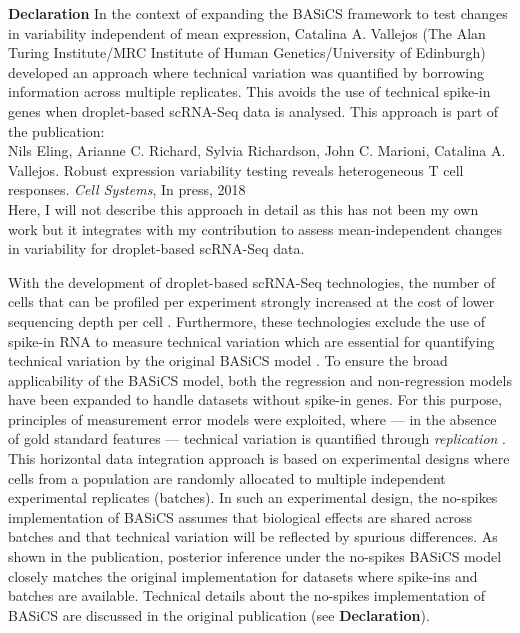 \begin{Comment}
\textbf{Declaration} In the context of expanding the BASiCS framework to test changes in variability independent of mean expression, Catalina A. Vallejos (The Alan Turing Institute/MRC Institute of Human Genetics/University of Edinburgh) developed an approach where technical variation was quantified by borrowing information across multiple replicates. This avoids the use of technical spike-in genes when droplet-based scRNA-Seq data is analysed. This approach is part of the publication:\\

Nils Eling, Arianne C. Richard, Sylvia Richardson, John C. Marioni, Catalina A. Vallejos. Robust expression variability testing reveals heterogeneous T cell responses. \emph{Cell Systems}, In press, 2018 \\

Here, I will not describe this approach in detail as this has not been my own work but it integrates with my contribution to assess mean-independent changes in variability for droplet-based scRNA-Seq data.
\end{Comment}

With the development of droplet-based scRNA-Seq technologies, the number of cells that can be profiled per experiment strongly increased at the cost of lower sequencing depth per cell \citep{Macosko2015, Klein2015, Zheng2017}. Furthermore, these technologies exclude the use of spike-in RNA to measure technical variation which are essential for quantifying technical variation by the original BASiCS model \citep{Vallejos2015BASiCS, Vallejos2016}. To ensure the broad applicability of the BASiCS model, both the regression and non-regression models have been expanded to handle datasets without spike-in genes. For this purpose, principles of measurement error models were exploited, where --- in the absence of gold standard features --- technical variation is quantified through {\it replication} \citep{Carroll1998}. This horizontal data integration approach is based on experimental designs where cells from a population are randomly allocated to multiple independent experimental replicates (batches). In such an experimental design, the no-spikes implementation of BASiCS assumes that biological effects are shared across batches and that technical variation will be reflected by spurious differences. As shown in the publication, posterior inference under the no-spikes BASiCS model closely matches the original implementation for datasets where spike-ins and batches are available. Technical details about the no-spikes implementation of BASiCS are discussed in the original publication (see \textbf{Declaration}).

